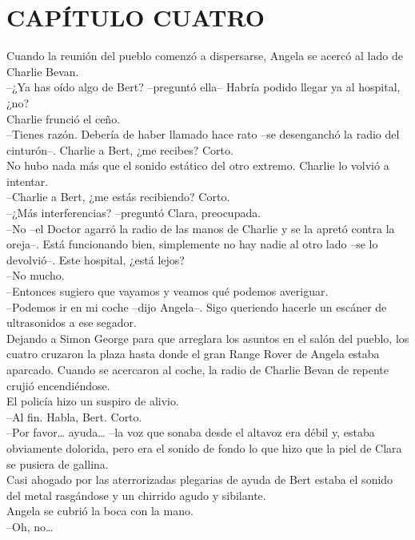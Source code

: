 \chapter*{CAPÍTULO CUATRO}
Cuando la reunión del pueblo comenzó a dispersarse, Angela se acercó al
lado de Charlie Bevan.\\
--¿Ya has oído algo de Bert? --preguntó ella-- Habría podido llegar ya
al hospital, ¿no?\\
Charlie frunció el ceño.\\
--Tienes razón. Debería de haber llamado hace rato --se desenganchó la
radio del cinturón--. Charlie a Bert, ¿me recibes? Corto.\\
No hubo nada más que el sonido estático del otro extremo. Charlie lo
volvió a intentar.\\
--Charlie a Bert, ¿me estás recibiendo? Corto.\\
--¿Más interferencias? --preguntó Clara, preocupada.\\
--No --el Doctor agarró la radio de las manos de Charlie y se la apretó
contra la oreja--. Está funcionando bien, simplemente no hay nadie al
otro lado --se lo devolvió--. Este hospital, ¿está lejos?\\
--No mucho.\\
--Entonces sugiero que vayamos y veamos qué podemos averiguar.\\
--Podemos ir en mi coche --dijo Angela--. Sigo queriendo hacerle un
escáner de ultrasonidos a ese segador.\\
Dejando a Simon George para que arreglara los asuntos en el salón del
pueblo, los cuatro cruzaron la plaza hasta donde el gran Range Rover de
Angela estaba aparcado. Cuando se acercaron al coche, la radio de
Charlie Bevan de repente crujió encendiéndose.\\
El policía hizo un suspiro de alivio.\\
--Al fin. Habla, Bert. Corto.\\
--Por favor\ldots{} ayuda\ldots{} --la voz que sonaba desde el altavoz
era débil y, estaba obviamente dolorida, pero era el sonido de fondo lo
que hizo que la piel de Clara se pusiera de gallina.\\
Casi ahogado por las aterrorizadas plegarias de ayuda de Bert estaba el
sonido del metal rasgándose y un chirrido agudo y sibilante.\\
Angela se cubrió la boca con la mano.\\
--Oh, no\ldots{}\\
